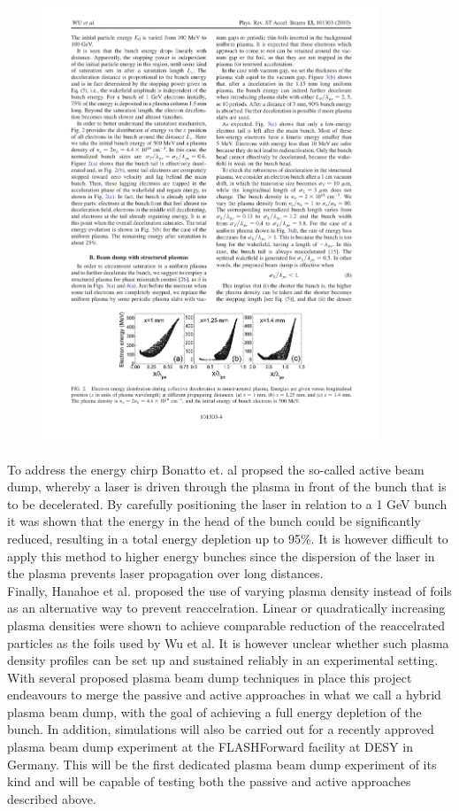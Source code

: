\documentclass[%
 onecolumn,notitlepage,
 amsmath,amssymb,
 aps,
 longbibliography
]{revtex4-1}
\begin{document}
\begin{figure}
\centering
\includegraphics[width=0.9\textwidth]{Wu_energy_uniform.pdf}
\caption{}
\label{Wu}
\end{figure}
To address the energy chirp Bonatto et. al \cite{Bonatto2015} propsed the so-called active beam dump, whereby a laser is driven through the plasma in front of the bunch that is to be decelerated. By carefully positioning the laser in relation to a 1 GeV bunch it was shown that the energy in the head of the bunch could be significantly reduced, resulting in a total energy depletion up to 95\%. It is however difficult to apply this method to higher energy bunches since the dispersion of the laser in the plasma prevents laser propagation over long distances. \\
Finally, Hanahoe et al. \cite{Hanahoe2017} proposed the use of varying plasma density instead of foils as an alternative way to prevent reaccelration. Linear or quadratically increasing plasma densities were shown to achieve comparable reduction of the reaccelrated particles as the foils used by Wu et al.  It is however unclear whether such plasma density profiles can be set up and sustained reliably in an experimental setting. \\
With several proposed plasma beam dump techniques in place this project endeavours to merge the passive and active approaches in what we call a hybrid plasma beam dump, with the goal of achieving a full energy depletion of the bunch. In addition, simulations will also be carried out for a recently approved plasma beam dump experiment at the FLASHForward facility at DESY in Germany. This will be the first dedicated plasma beam dump experiment of its kind and will be capable of testing both the passive and active approaches described above. 
\end{document}
